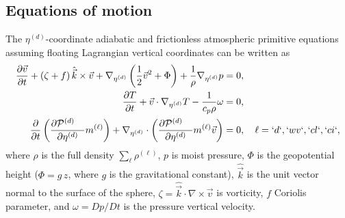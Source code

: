 \documentclass{agujournal}
\begin{document}

%
\subsection{Equations of motion}
The $\eta^{(d)}$-coordinate adiabatic and frictionless atmospheric primitive equations assuming floating Lagrangian vertical coordinates \citep{S1945JAS,L2004MWR} can be written as
\begin{align}
\frac{\partial \vec{v}}{\partial t} + \left( \zeta + f \right) {\hat{\vec{k}}} \times \vec{v}  + \nabla_{\eta^{(d)}} \left( \frac12 \vec{v}^2 + \Phi \right)  + \frac{1}{\rho} \nabla_{\eta^{(d)}} p &= 0,\label{E:PEmom} \\
\frac{\partial T}{\partial t} + \vec{v} \cdot \nabla_{\eta^{(d)}} T  -  \frac{1}{c_p \rho} \omega  &= 0, \label{E:PEtemp} \\
\frac{\partial}{\partial t} \left( \frac{\partial \mathcal{P}^{(d)}\quad }{\partial \eta^{(d)}} m^{(\ell)} \right) +  \nabla_{\eta^{(d)}}\cdot   \left( \frac{\partial \mathcal{P}^{(d)}\quad }{\partial \eta^{(d)}} m^{(\ell)} \vec{v} \right)  &= 0, \quad \ell=`d`,`wv`,`cl`,`ci`, \label{E:PEq}
\end{align}
where $\rho$ is the full density $\sum_\ell \rho^{(\ell)}$, $p$ is moist pressure, $\Phi$ is the geopotential height ($\Phi=g\, z$, where $g$ is the gravitational constant), ${\hat{\vec{k}}}$ is the unit vector normal to the surface of the sphere, $\zeta = {\hat{\vec{k}}} \cdot {\nabla \times} \vec{v}$ is vorticity, $f$ Coriolis parameter, and $\omega = Dp/Dt$ is the pressure vertical velocity. 
\end{document}
